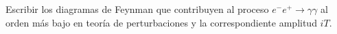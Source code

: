 Escribir los diagramas de Feynman que contribuyen al proceso $e^{-} e^{+} \rightarrow \gamma \gamma$ al orden más bajo en teoría de perturbaciones y la correspondiente amplitud $iT$.

\begin{solution}\ \\

\end{solution}